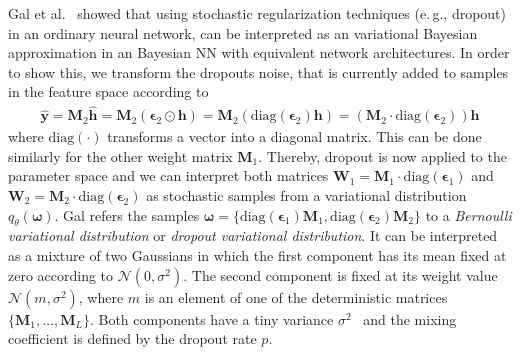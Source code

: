 \documentclass[runningheads]{llncs}
\begin{document}
Gal et al.~\cite{Gal2016Uncertainty} showed that using stochastic regularization techniques (e.\,g., dropout) in an ordinary neural network, can be interpreted as an variational Bayesian approximation in an Bayesian NN with equivalent network architectures.
In order to show this, we transform the dropouts noise, that is currently added to samples in the feature space according to 
\begin{align*}
    \hat{\mathbf{y}} = \mathbf{M}_2\hat{\mathbf{h}} 
    = \mathbf{M}_2 \left( \boldsymbol{\epsilon}_2 \odot \mathbf{h}   \right) 
    = \mathbf{M}_2 \left( \mathrm{diag}\left(\boldsymbol{\epsilon}_2\right) \mathbf{h}   \right) 
    = \left(\mathbf{M}_2  \cdot\mathrm{diag}\left(\boldsymbol{\epsilon}_2\right)\right) \mathbf{h}    
\end{align*}
where $\mathrm{diag}(\cdot)$ transforms a vector into a diagonal matrix.
This can be done similarly for the other weight matrix $\mathbf{M}_1$. 
Thereby, dropout is now applied to the parameter space and we can interpret both matrices $\mathbf{W}_1 = \mathbf{M}_1  \cdot\mathrm{diag}\left(\boldsymbol{\epsilon}_1\right)$ and $\mathbf{W}_2 = \mathbf{M}_2  \cdot\mathrm{diag}\left(\boldsymbol{\epsilon}_2\right)$ as stochastic samples from a variational distribution $q_\theta(\boldsymbol{\omega})$.
Gal refers the samples $\boldsymbol{\omega} = \{\mathrm{diag}(\boldsymbol{\epsilon}_1)\mathbf{M}_1,\mathrm{diag}( \boldsymbol{\epsilon}_2)\mathbf{M}_2 \}$ to a \textit{Bernoulli variational distribution} or \textit{dropout variational distribution}.
It can be interpreted as a mixture of two Gaussians in which the first component has its mean fixed at zero according to $\mathcal{N}(0, \sigma^2)$. The second component is fixed at its weight value $\mathcal{N}(m,\sigma^2)$, where $m$ is an element of one of the deterministic matrices $\{\mathbf{M}_1, \dots, \mathbf{M}_L\}$.
Both components have a tiny variance $\sigma^2$~\cite{Gal2015Bayesian} and the mixing coefficient is defined by the dropout rate $p$.
\end{document}
